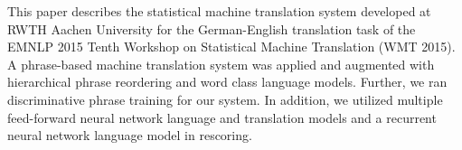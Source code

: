 This paper describes the statistical machine translation system developed at RWTH Aachen University for the German-English translation task of the EMNLP 2015 Tenth Workshop on Statistical Machine Translation (WMT 2015). A phrase-based machine translation system was applied and augmented with hierarchical phrase reordering and word class language models. Further, we ran discriminative phrase training for our system. In addition, we utilized multiple  feed-forward neural network language and translation models and a recurrent neural network language model in rescoring.
